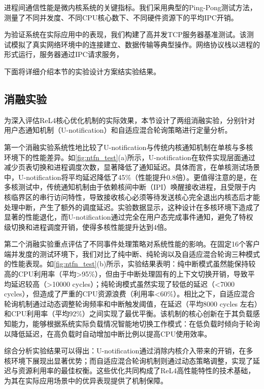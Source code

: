 进程间通信性能是微内核系统的关键指标。我们采用典型的Ping-Pong测试方法，测量了不同并发度、不同CPU核心数下、不同硬件资源下的平均IPC开销。

为验证系统在实际应用中的表现，我们构建了高并发TCP服务器基准测试。该测试模拟了真实网络环境中的连接建立、数据传输等典型操作。网络协议栈以进程的形式运行，服务器通过IPC请求服务，

下面将详细介绍本节的实验设计方案结实验结果。

\subsection{消融实验}
为深入评估ReL4核心优化机制的实际效果，本节设计了两组消融实验，分别针对用户态通知机制（U-notification）和自适应混合轮询策略进行定量分析。

第一个消融实验系统性地比较了U-notification与传统内核通知机制在单核与多核环境下的性能差异。如\ref{fig:ntfn_test}(a)所示，U-notification在软件实现层面通过减少页表切换和进程调度次数，显著降低了通知延迟。具体而言，在单核测试场景中，U-notification将平均延迟降低了45\%（性能提升0.8倍）。更值得注意的是，在多核测试中，传统通知机制由于依赖核间中断（IPI）唤醒接收进程，且受限于内核临界区的串行访问特性，导致接收核心必须等待发送核心完全退出内核态后才能处理中断，产生了额外的调度延迟。实验数据显示，这种设计在多核环境下造成了显著的性能退化，而U-notification通过完全在用户态完成事件通知，避免了特权级切换和进程调度开销，使得多核性能提升达到4倍。

第二个消融实验重点评估了不同事件处理策略对系统性能的影响。在固定16个客户端并发度的测试环境下，我们对比了纯中断、纯轮询以及自适应混合轮询三种模式的性能表现。如\ref{fig:ntfn_test}(b)所示，实验结果表明：纯中断模式虽然能保持较高的CPU利用率（平均>95\%），但由于中断处理固有的上下文切换开销，导致平均延迟较高（>10000 cycles）；纯轮询模式虽然实现了较低的延迟（<7000 cycles），但造成了严重的CPU资源浪费（利用率<60\%）。相比之下，自适应混合轮询机制通过动态调整轮询频率和中断触发阈值，在延迟（平均8000 cycles 左右）和CPU利用率（平均92\%）之间实现了最优平衡。该机制的核心创新在于其负载感知能力，能够根据系统实际负载情况智能地切换工作模式：在低负载时倾向于轮询以降低延迟，在高负载时自动增加中断比例以提高CPU使用效率。

综合分析实验结果可以得出：U-notification通过消除内核介入带来的开销，在多核环境下展现出显著优势；而自适应混合轮询机制则通过动态策略调整，实现了延迟与资源利用率的最佳权衡。这些优化共同构成了ReL4高性能特性的技术基础，为其在实际应用场景中的优异表现提供了机制保障。

